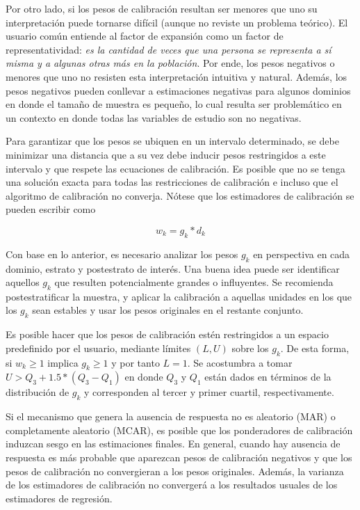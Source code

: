 \documentclass[
  10pt,
  spanish,
]{book}
\begin{document}
Por otro lado, si los pesos de calibración resultan ser menores que uno su interpretación puede tornarse difícil (aunque no reviste un problema teórico). El usuario común entiende al factor de expansión como un factor de representatividad: \emph{es la cantidad de veces que una persona se representa a sí misma y a algunas otras más en la población}. Por ende, los pesos negativos o menores que uno no resisten esta interpretación intuitiva y natural. Además, los pesos negativos pueden conllevar a estimaciones negativas para algunos dominios en donde el tamaño de muestra es pequeño, lo cual resulta ser problemático en un contexto en donde todas las variables de estudio son no negativas.

Para garantizar que los pesos se ubiquen en un intervalo determinado, se debe minimizar una distancia que a su vez debe inducir pesos restringidos a este intervalo y que respete las ecuaciones de calibración. Es posible que no se tenga una solución exacta para todas las restricciones de calibración e incluso que el algoritmo de calibración no converja. Nótese que los estimadores de calibración se pueden escribir como

\[
w_k = g_k * d_k
\]

Con base en lo anterior, es necesario analizar los pesos \(g_k\) en perspectiva en cada dominio, estrato y postestrato de interés. Una buena idea puede ser identificar aquellos \(g_k\) que resulten potencialmente grandes o influyentes. Se recomienda postestratificar la muestra, y aplicar la calibración a aquellas unidades en los que los \(g_k\) sean estables y usar los pesos originales en el restante conjunto.

Es posible hacer que los pesos de calibración estén restringidos a un espacio predefinido por el usuario, mediante límites \((L, U)\) sobre los \(g_k\). De esta forma, si \(w_k \geq 1\) implica \(g_k \geq 1\) y por tanto \(L=1\). Se acostumbra a tomar \(U > Q_3 + 1.5 * (Q_3 - Q_1)\) en donde \(Q_3\) y \(Q_1\) están dados en términos de la distribución de \(g_k\) y corresponden al tercer y primer cuartil, respectivamente.

Si el mecanismo que genera la ausencia de respuesta no es aleatorio (MAR) o completamente aleatorio (MCAR), es posible que los ponderadores de calibración induzcan sesgo en las estimaciones finales. En general, cuando hay ausencia de respuesta es más probable que aparezcan pesos de calibración negativos y que los pesos de calibración no convergieran a los pesos originales. Además, la varianza de los estimadores de calibración no convergerá a los resultados usuales de los estimadores de regresión.
\end{document}
